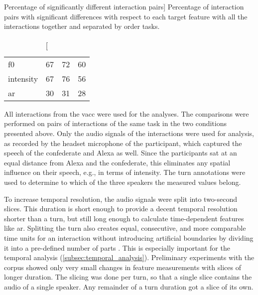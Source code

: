 \begin{table}[t]
	\centering
	\caption
		[Percentage of significantly different interaction pairs]
		{Percentage of interaction pairs with significant differences with respect to each target feature with all the interactions together and separated by order tasks.}
	\label{tab:signif_conditions}
	\begin{tabularx}{\linewidth}{XSSS}
		\toprule
		 & {} & {}	& {}	\\
		\midrule
		\acs{f0}	& 67	& 72	& 60 \\
		intensity 	& 67	& 76	& 56 \\
		\acs{ar}	& 30	& 31	& 28 \\
		\bottomrule	
	\end{tabularx}
\end{table}

All interactions from the \ac{vacc} were used for the analyses.
The comparisons were performed on pairs of interactions of the same task in the two conditions presented above.
Only the audio signals of the interactions were used for analysis, as recorded by the headset microphone of the participant, which captured the speech of the confederate and Alexa as well.
Since the participants sat at an equal distance from Alexa and the confederate, this eliminates any spatial influence on their speech, e.g., in terms of intensity.
The turn annotations were used to determine to which of the three speakers the measured values belong.

To increase temporal resolution, the audio signals were split into two-second slices.
This duration is short enough to provide a decent temporal resolution shorter than a turn, but still long enough to calculate time-dependent features like \acf{ar}.
Splitting the turn also creates equal, consecutive, and more comparable time units for an interaction without introducing artificial boundaries by dividing it into a pre-defined number of parts \citep{Silber-Varod2018prosodic}.
This is especially important for the temporal analysis (\cref{subsec:temporal_analysis}).
Preliminary experiments with the corpus showed only very small changes in feature measurements with slices of longer duration.
The slicing was done per turn, so that a single slice contains the audio of a single speaker.
Any remainder of a turn duration got a slice of its own.

